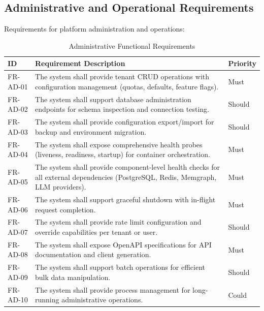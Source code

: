 \documentclass[a4paper,twoside]{sapthesis}
\begin{document}
\subsection{Administrative and Operational Requirements}
\label{subsec:fr-admin}

Requirements for platform administration and operations:

\begin{table}[htbp]
\centering
\caption{Administrative Functional Requirements}
\label{tab:fr-admin}
\small
\begin{tabularx}{\textwidth}{|l|X|l|}
\hline
\textbf{ID} & \textbf{Requirement Description} & \textbf{Priority} \\
\midrule
FR-AD-01 & The system shall provide tenant CRUD operations with configuration management (quotas, defaults, feature flags). & Must \\
\midrule
FR-AD-02 & The system shall support database administration endpoints for schema inspection and connection testing. & Should \\
\midrule
FR-AD-03 & The system shall provide configuration export/import for backup and environment migration. & Should \\
\midrule
FR-AD-04 & The system shall expose comprehensive health probes (liveness, readiness, startup) for container orchestration. & Must \\
\midrule
FR-AD-05 & The system shall provide component-level health checks for all external dependencies (PostgreSQL, Redis, Memgraph, LLM providers). & Must \\
\midrule
FR-AD-06 & The system shall support graceful shutdown with in-flight request completion. & Must \\
\midrule
FR-AD-07 & The system shall provide rate limit configuration and override capabilities per tenant or user. & Should \\
\midrule
FR-AD-08 & The system shall expose OpenAPI specifications for API documentation and client generation. & Must \\
\midrule
FR-AD-09 & The system shall support batch operations for efficient bulk data manipulation. & Should \\
\midrule
FR-AD-10 & The system shall provide process management for long-running administrative operations. & Could \\
\midrule
\end{tabularx}
\end{table}
\end{document}
